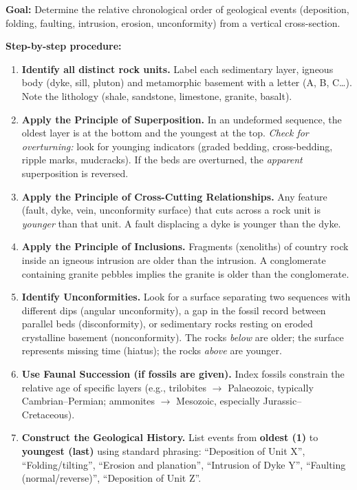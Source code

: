 \documentclass[11pt]{article}
\newcommand{\cle}[1]{{\popxbold\color{popdark}#1}}
\begin{document}
\begin{methode}
\textbf{Goal:} Determine the relative chronological order of geological events (deposition, folding, faulting, intrusion, erosion, unconformity) from a vertical cross-section.

\textbf{Step-by-step procedure:}
\begin{enumerate}
    \item \textbf{Identify all distinct rock units.} Label each sedimentary layer, igneous body (dyke, sill, pluton) and metamorphic basement with a letter (A, B, C\ldots). Note the lithology (shale, sandstone, limestone, granite, basalt).
    \item \textbf{Apply the \cle{Principle of Superposition}.} In an undeformed sequence, the oldest layer is at the bottom and the youngest at the top. \emph{Check for overturning:} look for younging indicators (graded bedding, cross-bedding, ripple marks, mudcracks). If the beds are overturned, the \emph{apparent} superposition is reversed.
    \item \textbf{Apply the \cle{Principle of Cross-Cutting Relationships}.} Any feature (fault, dyke, vein, unconformity surface) that cuts across a rock unit is \emph{younger} than that unit. A fault displacing a dyke is younger than the dyke.
    \item \textbf{Apply the \cle{Principle of Inclusions}.} Fragments (xenoliths) of country rock inside an igneous intrusion are older than the intrusion. A conglomerate containing granite pebbles implies the granite is older than the conglomerate.
    \item \textbf{Identify \cle{Unconformities}.} Look for a surface separating two sequences with different dips (\cle{angular unconformity}), a gap in the fossil record between parallel beds (\cle{disconformity}), or sedimentary rocks resting on eroded crystalline basement (\cle{nonconformity}). The rocks \emph{below} are older; the surface represents missing time (\cle{hiatus}); the rocks \emph{above} are younger.
    \item \textbf{Use \cle{Faunal Succession} (if fossils are given).} Index fossils constrain the relative age of specific layers (e.g., trilobites $\rightarrow$ Palaeozoic, typically Cambrian--Permian; ammonites $\rightarrow$ Mesozoic, especially Jurassic--Cretaceous).
    \item \textbf{Construct the \cle{Geological History}.} List events from \textbf{oldest (1)} to \textbf{youngest (last)} using standard phrasing: ``Deposition of Unit X'', ``Folding/tilting'', ``Erosion and planation'', ``Intrusion of Dyke Y'', ``Faulting (normal/reverse)'', ``Deposition of Unit Z''.
\end{enumerate}


\end{methode}
\end{document}
